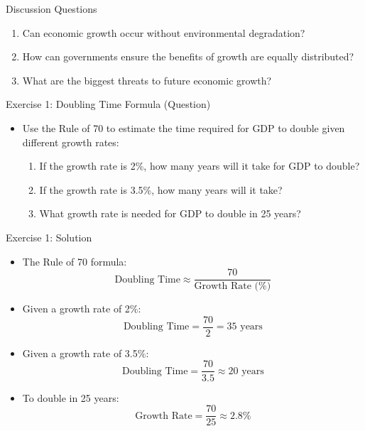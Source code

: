 \documentclass{beamer}
\begin{document}
\begin{frame}{Discussion Questions}
    \begin{enumerate}
        \item Can economic growth occur without environmental degradation?
        \item How can governments ensure the benefits of growth are equally distributed?
        \item What are the biggest threats to future economic growth?
    \end{enumerate}
\end{frame}

\begin{frame}{Exercise 1: Doubling Time Formula (Question)}
    \begin{itemize}
        \item Use the Rule of 70 to estimate the time required for GDP to double given different growth rates:
        \begin{enumerate}
            \item If the growth rate is 2\%, how many years will it take for GDP to double?
            \item If the growth rate is 3.5\%, how many years will it take?
            \item What growth rate is needed for GDP to double in 25 years?
        \end{enumerate}
    \end{itemize}
\end{frame}

\begin{frame}{Exercise 1: Solution}
    \begin{itemize}
        \item The Rule of 70 formula:
        \begin{equation*}
            \text{Doubling Time} \approx \frac{70}{\text{Growth Rate (\%)}}
        \end{equation*}
        \item Given a growth rate of 2\%:
        \begin{equation*}
            \text{Doubling Time} = \frac{70}{2} = 35 \text{ years}
        \end{equation*}
        \item Given a growth rate of 3.5\%:
        \begin{equation*}
            \text{Doubling Time} = \frac{70}{3.5} \approx 20 \text{ years}
        \end{equation*}
        \item To double in 25 years:
        \begin{equation*}
            \text{Growth Rate} = \frac{70}{25} \approx 2.8\%
        \end{equation*}
    \end{itemize}
\end{frame}
\end{document}
